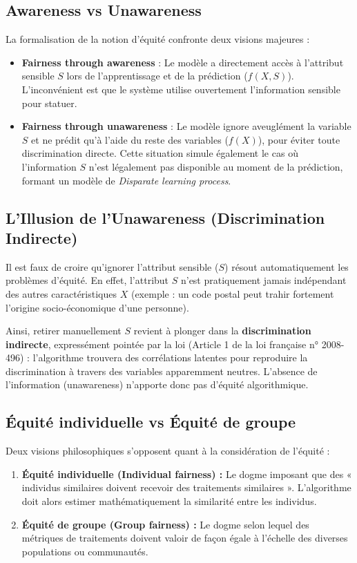 \subsection{Awareness vs Unawareness}
La formalisation de la notion d'équité confronte deux visions majeures :
\begin{itemize}
    \item \textbf{Fairness through awareness} : Le modèle a directement accès à l'attribut sensible $S$ lors de l'apprentissage et de la prédiction ($f(X, S)$). L'inconvénient est que le système utilise ouvertement l'information sensible pour statuer.
    \item \textbf{Fairness through unawareness} : Le modèle ignore aveuglément la variable $S$ et ne prédit qu'à l'aide du reste des variables ($f(X)$), pour éviter toute discrimination directe. Cette situation simule également le cas où l'information $S$ n'est légalement pas disponible au moment de la prédiction, formant un modèle de \textit{Disparate learning process}.
\end{itemize}

\subsection{L'Illusion de l'Unawareness (Discrimination Indirecte)}
Il est faux de croire qu'ignorer l'attribut sensible ($S$) résout automatiquement les problèmes d'équité. En effet, l'attribut $S$ n'est pratiquement jamais indépendant des autres caractéristiques $X$ (exemple : un code postal peut trahir fortement l'origine socio-économique d'une personne). 

Ainsi, retirer manuellement $S$ revient à plonger dans la \textbf{discrimination indirecte}, expressément pointée par la loi (Article 1 de la loi française n° 2008-496) : l'algorithme trouvera des corrélations latentes pour reproduire la discrimination à travers des variables apparemment neutres. L'absence de l'information (unawareness) n'apporte donc pas d'équité algorithmique.

\subsection{Équité individuelle vs Équité de groupe}
Deux visions philosophiques s'opposent quant à la considération de l'équité :
\begin{enumerate}
    \item \textbf{Équité individuelle (Individual fairness) :} Le dogme imposant que des « individus similaires doivent recevoir des traitements similaires ». L'algorithme doit alors estimer mathématiquement la similarité entre les individus.
    \item \textbf{Équité de groupe (Group fairness) :} Le dogme selon lequel des métriques de traitements doivent valoir de façon égale à l'échelle des diverses populations ou communautés.
\end{enumerate}

